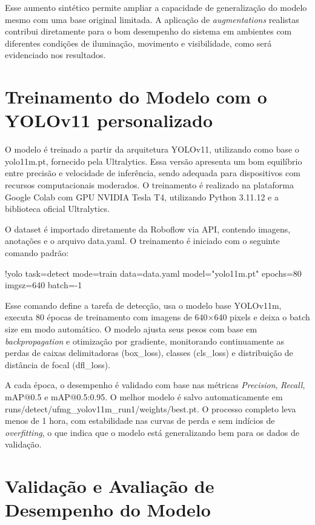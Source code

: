 Esse aumento sintético permite ampliar a capacidade de generalização do modelo mesmo com uma base original limitada. A aplicação de \textit{augmentations} realistas contribui diretamente para o bom desempenho do sistema em ambientes com diferentes condições de iluminação, movimento e visibilidade, como será evidenciado nos resultados.

\section{Treinamento do Modelo com o YOLOv11 personalizado}

O modelo é treinado a partir da arquitetura YOLOv11, utilizando como base o yolo11m.pt, fornecido pela Ultralytics. Essa versão apresenta um bom equilíbrio entre precisão e velocidade de inferência, sendo adequada para dispositivos com recursos computacionais moderados. O treinamento é realizado na plataforma Google Colab com GPU NVIDIA Tesla T4, utilizando Python 3.11.12 e a biblioteca oficial Ultralytics.

O dataset é importado diretamente da Roboflow via API, contendo imagens, anotações e o arquivo data.yaml. O treinamento é iniciado com o seguinte comando padrão:

!yolo task=detect mode=train data=data.yaml model="yolo11m.pt" epochs=80\\imgsz=640 batch=-1

Esse comando define a tarefa de detecção, usa o modelo base YOLOv11m, executa 80 épocas de treinamento com imagens de 640×640 pixels e deixa o batch size em modo automático. O modelo ajusta seus pesos com base em \textit{backpropagation} e otimização por gradiente, monitorando continuamente as perdas de caixas delimitadoras (box\_loss), classes (cls\_loss) e distribuição de distância de focal (dfl\_loss).

A cada época, o desempenho é validado com base nas métricas \textit{Precision}, \textit{Recall}, mAP@0.5 e mAP@0.5:0.95. O melhor modelo é salvo automaticamente em runs/detect/ufmg\_yolov11m\_run1/weights/best.pt. O processo completo leva menos de 1 hora, com estabilidade nas curvas de perda e sem indícios de \textit{overfitting}, o que indica que o modelo está generalizando bem para os dados de validação.

\section{Validação e Avaliação de Desempenho do Modelo}

